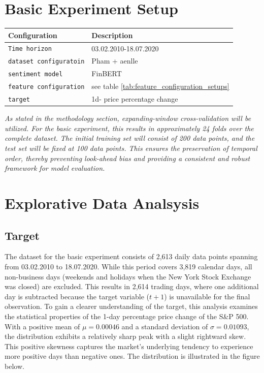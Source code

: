 \documentclass[Master,english,IEEE]{twbook}
\begin{document}
\section{Basic Experiment Setup}
\par\vspace{2ex}
\begin{minipage}{\linewidth}
    \centering
    \small
    \begin{tabularx}{0.98\linewidth}{|l|X|}
    \hline
    \textbf{Configuration} & \textbf{Description} \\ \hline
    \texttt{Time horizon} & 03.02.2010-18.07.2020\\ \hline
    \texttt{dataset configuratoin} & Pham \cite{pham_financial_news} + aenlle \cite{aenlle_financial_news} \\ \hline
    \texttt{sentiment model} & FinBERT \\ \hline
    \texttt{feature configuration} & see table \ref{tab:feature_configuration_setups} \\ \hline
    \texttt{target} & 1d- price percentage change \\ \hline
    \end{tabularx}
    \label{tab:experiment_setup}
\end{minipage}
\par\vspace{1ex}

\textit{As stated in the methodology section, expanding-window cross-validation will be utilized. For the basic experiment, this results in approximately 24 folds over the complete dataset. The initial training set will consist of 200 data points, and the test set will be fixed at 100 data points. This ensures the preservation of temporal order, thereby preventing look-ahead bias and providing a consistent and robust framework for model evaluation.}

\section{Explorative Data Analsysis}
\subsection{Target}
The dataset for the basic experiment consists of 2,613 daily data points spanning from 03.02.2010 to 18.07.2020. While this period covers 3,819 calendar days, all non-business days (weekends and holidays when the New York Stock Exchange was closed) are excluded. This results in 2,614 trading days, where one additional day is subtracted because the target variable ($t+1$) is unavailable for the final observation. To gain a clearer understanding of the target, this analysis examines the statistical properties of the 1-day percentage price change of the S\&P 500. With a positive mean of $\mu = 0.00046$ and a standard deviation of $\sigma = 0.01093$, the distribution exhibits a relatively sharp peak with a slight rightward skew. This positive skewness captures the market's underlying tendency to experience more positive days than negative ones. The distribution is illustrated in the figure below.
\end{document}
